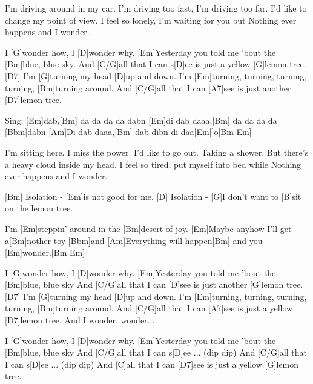 \vspace{1em}
\begin{guitar}
	I'm driving around in my car.
	I'm driving too fast, I'm driving too far.
	I'd like to change my point of view.
	I feel so lonely, I'm waiting for you but
	Nothing ever happens and I wonder.
	
	I [G]wonder how, I [D]wonder why. 
	[Em]Yesterday you told me 'bout the [Bm]blue, blue sky.
	And [C/G]all that I can s[D]ee is just a yellow [G]lemon tree.[D7]{}
	I'm [G]turning my head [D]up and down.
	I'm [Em]turning, turning, turning, turning, [Bm]turning around.
	And [C/G]all that I can [A7]see is just another [D7]lemon tree.
	
	Sing: [Em]dab,[Bm] da da da da dabn [Em]di dab daaa,[Bm] da da da da [Bbm]dabn
	 [Am]Di dab daaa,[Bm] dab dibn di daa[Em|]o[Bm Em]{}
	
	I'm sitting here. I miss the power.
	I'd like to go out. Taking a shower.
	But there's a heavy cloud inside my head.
	I feel so tired, put myself into bed while
	Nothing ever happens and I wonder.
	
	[Bm] Isolation - [Em]is not good for me.
	[D] Isolation - [G]I don't want to [B]sit on the lemon tree.
	
	I'm [Em]steppin' around in the [Bm]desert of joy.
	[Em]Maybe anyhow I'll get a[Bm]nother toy [Bbm]and
	[Am]Everything will happen[Bm] and you [Em]wonder.[Bm Em]{}
	
	I [G]wonder how, I [D]wonder why. 
	[Em]Yesterday you told me 'bout the [Bm]blue, blue sky
	And [C/G]all that I can [D]see is just another [G]lemon tree.[D7]{}
	I'm [G]turning my head [D]up and down.
	I'm [Em]turning, turning, turning, turning, [Bm]turning around.
	And [C/G]all that I can [A7]see is just a yellow [D7]lemon tree. And I wonder, wonder...
	
	I [G]wonder how, I [D]wonder why. 
	[Em]Yesterday you told me 'bout the [Bm]blue, blue sky
	And [C/G]all that I can s[D]ee ... (dip dip)
	And [C/G]all that I can s[D]ee ... (dip dip)
	And [C]all that I can [D7]see is just a yellow [G]lemon tree.
\end{guitar}